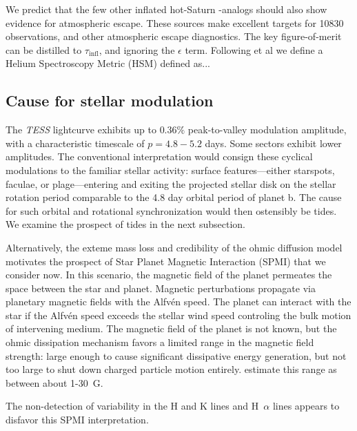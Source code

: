 \documentclass[twocolumn]{aastex631}
\newcommand{\hatpb}{\object{HAT-P-67 b}}
\begin{document}
We predict that the few other inflated hot-Saturn \hatpb-analogs should also show evidence for atmospheric escape.  These sources make excellent targets for  10830 observations, and other atmospheric escape diagnostics.  The key figure-of-merit can be distilled to $\tau_\mathrm{infl}$, and ignoring the $\epsilon$ term.  Following  et al we define a Helium Spectroscopy Metric (HSM) defined as...


\subsection{Cause for stellar modulation}
The \emph{TESS} lightcurve exhibits up to $0.36\%$ peak-to-valley modulation amplitude, with a characteristic timescale of $p=4.8-5.2$ days. Some sectors exhibit lower amplitudes.  The conventional interpretation would consign these cyclical modulations to the familiar stellar activity: surface features---either starspots, faculae, or plage---entering and exiting the projected stellar disk on the stellar rotation period comparable to the 4.8 day orbital period of planet b.  The cause for such orbital and rotational synchronization would then ostensibly be tides.  We examine the prospect of tides in the next subsection.

Alternatively, the exteme mass loss and credibility of the ohmic diffusion model motivates the prospect of Star Planet Magnetic Interaction (SPMI) that we consider now.  In this scenario, the magnetic field of the planet permeates the space between the star and planet.  Magnetic perturbations propagate via planetary magnetic fields with the Alfv\'en speed.  The planet can interact with the star if the Alfv\'en speed exceeds the stellar wind speed controling the bulk motion of intervening medium.  The magnetic field of the planet is not known, but the ohmic dissipation mechanism favors a limited range in the magnetic field strength: large enough to cause significant dissipative energy generation, but not too large to shut down charged particle motion entirely.  \citet{2011ApJ...738....1B} estimate this range as between about 1-30~G.

The non-detection of variability in the  H and K lines and H~$\alpha$ lines appears to disfavor this SPMI interpretation.

\end{document}

